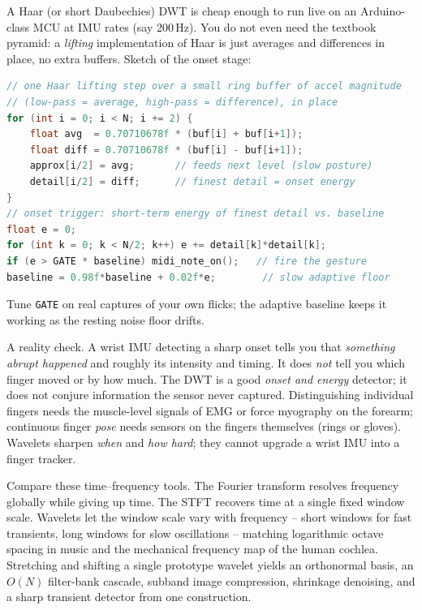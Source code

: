\begin{buildbox}
A Haar (or short Daubechies) DWT is cheap enough to run live on an Arduino-class
MCU at IMU rates (say 200\,Hz). You do not even need the textbook pyramid: a
\emph{lifting} implementation of Haar is just averages and differences in place,
no extra buffers. Sketch of the onset stage:
\begin{lstlisting}[language=C]
// one Haar lifting step over a small ring buffer of accel magnitude
// (low-pass = average, high-pass = difference), in place
for (int i = 0; i < N; i += 2) {
    float avg  = 0.70710678f * (buf[i] + buf[i+1]);
    float diff = 0.70710678f * (buf[i] - buf[i+1]);
    approx[i/2] = avg;       // feeds next level (slow posture)
    detail[i/2] = diff;      // finest detail = onset energy
}
// onset trigger: short-term energy of finest detail vs. baseline
float e = 0;
for (int k = 0; k < N/2; k++) e += detail[k]*detail[k];
if (e > GATE * baseline) midi_note_on();   // fire the gesture
baseline = 0.98f*baseline + 0.02f*e;        // slow adaptive floor
\end{lstlisting}
Tune \texttt{GATE} on real captures of your own flicks; the adaptive baseline
keeps it working as the resting noise floor drifts.
\end{buildbox}

\begin{trapbox}
A reality check. A wrist IMU detecting a sharp onset
tells you that \emph{something abrupt happened} and roughly its intensity and
timing. It does \emph{not} tell you which finger moved or by how much. The DWT is
a good \emph{onset and energy} detector; it does not conjure information the
sensor never captured. Distinguishing individual fingers needs the muscle-level
signals of EMG or force myography on the forearm; continuous finger \emph{pose}
needs sensors on the fingers themselves (rings or gloves). Wavelets sharpen
\emph{when} and \emph{how hard}; they cannot upgrade a wrist IMU into a finger
tracker.
\end{trapbox}

\begin{aestheticbox}
Compare these time--frequency tools. The Fourier transform resolves
frequency globally while giving up time. The STFT recovers time at a single fixed window scale.
Wavelets let the window scale vary with frequency -- short windows for fast transients,
long windows for slow oscillations -- matching logarithmic octave spacing in music and
the mechanical frequency map of the human cochlea. Stretching and shifting a single prototype
wavelet yields an orthonormal basis, an $O(N)$ filter-bank cascade, subband image compression,
shrinkage denoising, and a sharp transient detector from one construction.
\end{aestheticbox}

